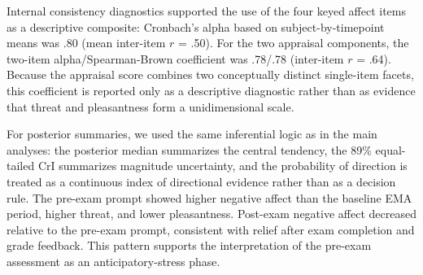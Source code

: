 \documentclass[
  english,
  man,floatsintext]{apa6}
\begin{document}
Internal consistency diagnostics supported the use of the four keyed affect items as a descriptive composite: Cronbach's alpha based on subject-by-timepoint means was .80 (mean inter-item \(r\) = .50). For the two appraisal components, the two-item alpha/Spearman-Brown coefficient was .78/.78 (inter-item \(r\) = .64). Because the appraisal score combines two conceptually distinct single-item facets, this coefficient is reported only as a descriptive diagnostic rather than as evidence that threat and pleasantness form a unidimensional scale.

For posterior summaries, we used the same inferential logic as in the main analyses: the posterior median summarizes the central tendency, the 89\% equal-tailed CrI summarizes magnitude uncertainty, and the probability of direction is treated as a continuous index of directional evidence rather than as a decision rule. The pre-exam prompt showed higher negative affect than the baseline EMA period, higher threat, and lower pleasantness. Post-exam negative affect decreased relative to the pre-exam prompt, consistent with relief after exam completion and grade feedback. This pattern supports the interpretation of the pre-exam assessment as an anticipatory-stress phase.

\begin{table}[!h]
\centering
\caption{\label{tab:table-s-mc-contrasts}Bayesian manipulation-check contrasts. CrIs are 89\% equal-tailed intervals and are not used as significance tests.}
\centering
{}
\end{table}
\end{document}
